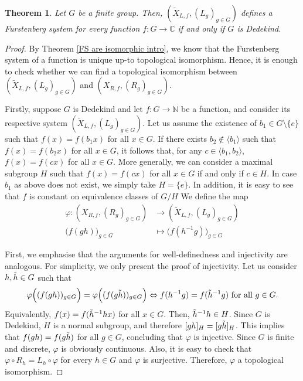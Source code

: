 \documentclass{amsart}
\numberwithin{equation}{section}
\newtheorem{theorem}[lemma]{Theorem}
\theoremstyle{definition}
\theoremstyle{plain}
\begin{document}
\begin{theorem}
    Let $G$ be a finite group.  Then, $(\widetilde{X}_{L,f}, (L_g)_{g\in G})$  defines a Furstenberg system for every function $f:G\to \mathbb{C}$ if and only if $G$ is Dedekind.
\end{theorem}
\begin{proof} By Theorem \ref{FS are isomorphic intro}, we know that the Furstenberg system of a function is unique up-to topological isomorphism. Hence, it is enough to check whether we can find a topological isomorphism between $(\widetilde{X}_{L,f}, (L_g)_{g\in G})$ and $(X_{R,f}, (R_g)_{g\in G})$.

    Firstly, suppose $G$ is Dedekind and let $f:G\to \mathbb{N}$ be a function, and consider its respective system $(\tilde{X}_{L,f}, (L_g)_{g\in G})$.  Let us assume the existence of $b_1\in G\setminus\{e\}$ such that $f(x)=f(b_1x)$ for all $x\in G$. If there exists $b_2\notin \langle b_1\rangle$ such that $f(x)=f(b_2x)$ for all $x\in G$, it follows that, for any $c\in \langle b_1,b_2\rangle $, $f(x)=f(cx)$ for all $x\in G$. More generally, we can consider a maximal subgroup $H$ such that $f(x)=f(cx)$ for all $x\in G$ if and only if $c\in H$. In case $b_1$ as above does not exist, we simply take $H=\{e\}$. In addition, it is easy to see that $f$ is constant on equivalence classes of $G/H$ We define the map
\begin{equation}
    \begin{aligned}
\varphi : (X_{R,f}, (R_g)_{g\in G}) &\to (\widetilde{X}_{L,f}, (L_g)_{g\in G}) \\
\Big(f(gh)\Big)_{g\in G} &\mapsto \Big(f(h^{-1}g)\Big)_{g\in G} 
\end{aligned}\label{finite_case_1}
\end{equation}

First, we emphasise that the arguments for well-definedness and injectivity
are analogous. For simplicity, we only present the proof of
injectivity. Let us consider $h,\Tilde{h}\in G$ such that $$\varphi \Big((f(gh))_{g\in G}\Big)=\varphi \Big((f(g\Tilde{h}))_{g\in G}\Big) \Leftrightarrow f(h^{-1}g)=f(\Tilde{h}^{-1}g) \text{ for all $g\in G$}.$$
Equivalently, $f(x)=f(\Tilde{h}^{-1}hx)$ for all $x\in G$.
Then, $\Tilde{h}^{-1}h\in H$. Since $G$ is Dedekind, $H$ is a normal subgroup, and therefore $[gh]_{H}=[g\Tilde{h}]_H$. This implies that $f(gh)=f(g\Tilde{h})$ for all $g\in G$, concluding that $\varphi$ is injective. Since $G$ is finite and discrete, $\varphi$ is obviously continuous. Also, it is easy to check that $\varphi \circ R_h=L_h\circ \varphi$ for every $h\in G$ and $\varphi$ is surjective. Therefore, $\varphi$ a topological isomorphism.


\end{proof}
\end{document}
